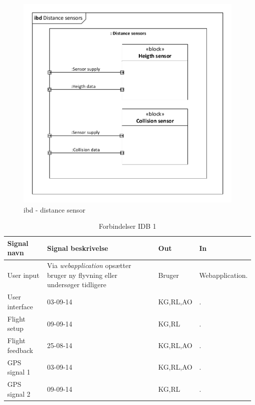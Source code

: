 

\begin{figure}[H]
\centering
\includegraphics[width=1\textwidth]{Billeder/IBD/ibd4_distancesensor.pdf}
\caption{ibd - distance sensor}
\label{fig:ibd_distancesensor}
\end{figure}

\begin{table}[H]
	\centering
		\begin{tabular}{|p{2.5 cm}|p{5.5 cm}|p{2.5 cm}|p{2.5 cm}|} 
		\hline
			\textbf{Signal navn} 	& \textbf{Signal beskrivelse}		& \textbf{Out} 				& \textbf{In}     \\ \hline
			User input 			& Via \textit{webapplication} opsætter bruger ny flyvning eller undersøger tidligere & Bruger 		& Webapplication.			    \\ \hline
			User interface 		& 03-09-14	& KG,RL,AO				& .				\\ \hline
			Flight setup		& 09-09-14	& KG,RL					& .	\\ \hline
			Flight feedback		& 25-08-14	& KG,RL,AO				& .			    \\ \hline
			GPS signal 1		& 03-09-14	& KG,RL,AO				& .				\\ \hline
			GPS signal 2		& 09-09-14	& KG,RL					& .	\\ \hline  
		\end{tabular}
	\caption{Forbindelser IDB 1}
	\label{tab:IDB1}
\end{table}
